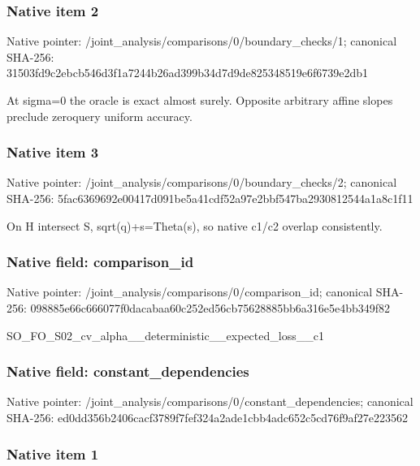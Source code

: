 \documentclass[10pt,a4paper]{article}
\begin{document}
\subsubsection{Native item 2}


Native pointer: /joint\_analysis/comparis\allowbreak{}ons/0/boundary\_checks/1; canonical SHA-256: 31503fd9c2ebcb546d3f1a72\allowbreak{}44b26ad399b34d7d9de82534\allowbreak{}8519e6f6739e2db1


At sigma=0 the oracle is exact almost surely. Opposite arbitrary affine slopes preclude zeroquery uniform accuracy.


\subsubsection{Native item 3}


Native pointer: /joint\_analysis/comparis\allowbreak{}ons/0/boundary\_checks/2; canonical SHA-256: 5fac6369692e00417d091be5\allowbreak{}a41cdf52a97e2bbf547ba293\allowbreak{}0812544a1a8c1f11


On H intersect S, sqrt(q)+s=Theta(s), so native c1/c2 overlap consistently.


\subsubsection{Native field: comparison\_id}


Native pointer: /joint\_analysis/comparis\allowbreak{}ons/0/comparison\_id; canonical SHA-256: 098885e66c666077f0dacaba\allowbreak{}a60c252ed56cb75628885bb6\allowbreak{}a316e5e4bb349f82


SO\_FO\_S02\_cv\_alpha\_\_dete\allowbreak{}rministic\_\_expected\_loss\allowbreak{}\_\_c1


\subsubsection{Native field: constant\_dependencies}


Native pointer: /joint\_analysis/comparis\allowbreak{}ons/0/constant\_dependenc\allowbreak{}ies; canonical SHA-256: ed0dd356b2406cacf3789f7f\allowbreak{}ef324a2ade1cbb4adc652c5c\allowbreak{}d76f9af27e223562



\subsubsection{Native item 1}
\end{document}
